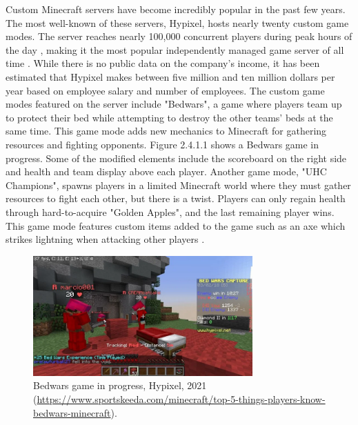 \documentclass{article}
\begin{document}
\begin{onehalfspacing}
Custom Minecraft servers have become incredibly popular in the past few
years. The most well-known of these servers, Hypixel, hosts nearly
twenty custom game modes. The server reaches nearly 100,000 concurrent
players during peak hours of the day \parencite{minecraftservers}, making
it the most popular independently managed game server of all time
\parencite{guinnessindependentserver}. While there is no public data on the
company's income, it has been estimated that Hypixel makes between five
million and ten million dollars per year based on employee salary and
number of employees. The custom game modes featured on the server
include "Bedwars", a game where players team up to protect their bed
while attempting to destroy the other teams' beds at the same time. This
game mode adds new mechanics to Minecraft for gathering resources and
fighting opponents. Figure 2.4.1.1 shows a Bedwars game in progress.
Some of the modified elements include the scoreboard on the right side
and health and team display above each player. Another game mode, "UHC
Champions", spawns players in a limited Minecraft world where they must
gather resources to fight each other, but there is a twist. Players can
only regain health through hard-to-acquire "Golden Apples", and the last
remaining player wins. This game mode features custom items added to the
game such as an axe which strikes lightning when attacking other players
\parencite{hypixelgames}.

\begin{figure}[h] 
    \centering
    \includegraphics[width=0.75\textwidth]{media/media/image5.png} 
    \caption{Bedwars game in progress, Hypixel, 2021 \\ (\url{https://www.sportskeeda.com/minecraft/top-5-things-players-know-bedwars-minecraft}).
} 
    \label{fig:2_4_1_1} 
\end{figure}



\end{onehalfspacing}
\end{document}
